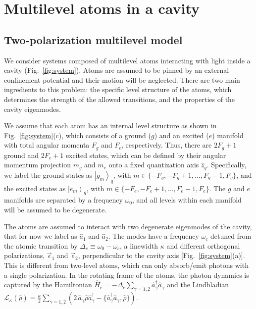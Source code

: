 \documentclass[aps,prx,superscriptaddress,twocolumn,notitlepage,nofootinbib,longbibliography]{revtex4-2}
\newcommand{\ket}[1]{\left|#1\right>}
\newcommand{\quv}{\hat{z}}
\newcommand{\qusub}{q}
\begin{document}

\section{Multilevel atoms in a cavity\label{sec:model}}




\subsection{Two-polarization multilevel model}

We consider  systems composed of multilevel atoms interacting with light inside a cavity (Fig.~\ref{fig:system}). Atoms are assumed to be pinned  by an external confinement potential and their motion will be neglected. There are two main ingredients to this problem: the specific level structure of the atoms, which determines the strength of the allowed transitions, and the properties of the cavity eigenmodes.

We assume that each atom has an internal level structure as shown in Fig.~\ref{fig:system}(c), which consists of a ground ($g$) and an excited ($e$) manifold with total angular momenta $F_g$ and $F_e$, respectively.
Thus, there are $2F_g+1$ ground and $2F_e+1$ excited states, which can be defined by their angular momentum projection $m_g$ and $m_e$ onto a fixed quantization axis $\quv_\qusub$. Specifically, we label the ground states as $\ket{g_m}_{\qusub}$, with $m\in\{-F_g,-F_g+1,\dots, F_g-1, F_g\}$, and the excited states as $\ket{e_m}_{\qusub}$, with $m\in\{-F_e,-F_e+1,\dots, F_e-1, F_e\}$. The $g$ and $e$ manifolds are separated by a frequency $\omega_0$, and all levels within each manifold will be assumed to be degenerate.

The atoms  are assumed to interact with  two degenerate  eigenmodes of the cavity,
that for now we label  as $\hat{a}_1$ and $\hat{a}_2$. The modes have a frequency $\omega_c$ detuned from the atomic transition by $\Delta_c\equiv\omega_0-\omega_c$, a linewidth $\kappa$ and different  orthogonal  polarizations, $\vec{\epsilon}_1$ and $\vec{\epsilon}_2$, perpendicular to  the cavity axis [Fig.~\ref{fig:system}(a)]. This is different from two-level atoms, which can only absorb/emit photons with a single polarization.
In the rotating frame of the atoms, the photon dynamics is captured by the Hamiltonian $\hat{H}_c = -\Delta_c \sum_{\gamma=1,2} \hat{a}^\dagger_\gamma \hat{a}_\gamma$ and the Lindbladian $\mathcal{L}_\kappa(\hat{\rho}) = \frac{\kappa}{2} \sum_{\gamma=1,2} \left( 2\,\hat{a}_\gamma \hat{\rho} \hat{a}_\gamma^\dagger - \{ \hat{a}_\gamma^\dagger \hat{a}_\gamma, \hat\rho \} \right)$.
\end{document}
